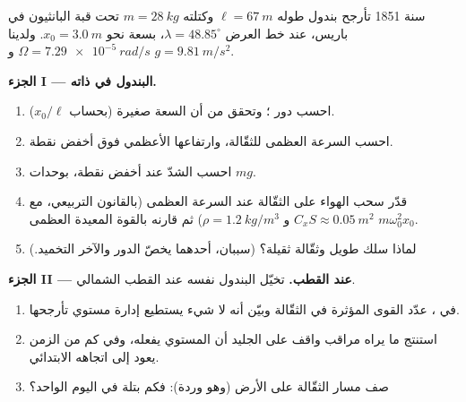 \begin{problem}
\label{pb:b1:non-inertial-frames:1}
سنة 1851 تأرجح بندول طوله $\ell = \qty{67}{m}$ وكتلته $m = \qty{28}{kg}$
تحت قبة البانثيون في باريس، عند خط العرض $\lambda =
48.85^\circ$، بسعة نحو $x_0 = \qty{3.0}{m}$. ولدينا $\Omega =
\qty{7.29e-5}{rad/s}$ و $g = \qty{9.81}{m/s^2}$.

\medskip
\noindent\textbf{الجزء I --- البندول في ذاته.}
\begin{enumerate}
  \item احسب دور ؛ وتحقق من أن السعة صغيرة
        (بحساب $x_0/\ell$).
  \item احسب السرعة العظمى للثقّالة، وارتفاعها الأعظمي فوق
        أخفض نقطة.
  \item احسب الشدّ عند أخفض نقطة، بوحدات $mg$.
  \item قدّر سحب الهواء على الثقّالة عند السرعة العظمى (بالقانون
        التربيعي، مع $C_xS \approx \qty{0.05}{m^2}$ و $\rho = \qty{1.2}{kg/m^3}$) ثم
        قارنه بالقوة المعيدة العظمى $m\omega_0^2x_0$.
  \item لماذا سلك طويل وثقّالة ثقيلة؟ (سببان، أحدهما يخصّ
        الدور والآخر التخميد.)
\end{enumerate}

\medskip
\noindent\textbf{الجزء II --- عند القطب.}
تخيّل البندول نفسه عند القطب الشمالي.
\begin{enumerate}[resume]
  \item في ، عدّد القوى المؤثرة في الثقّالة وبيّن
        أنه لا شيء يستطيع إدارة مستوي تأرجحها.
  \item استنتج ما يراه مراقب واقف على الجليد أن المستوي يفعله،
        وفي كم من الزمن يعود إلى اتجاهه الابتدائي.
  \item صف مسار الثقّالة على الأرض (وهو وردة): فكم بتلة
        في اليوم الواحد؟
\end{enumerate}


\end{problem}

